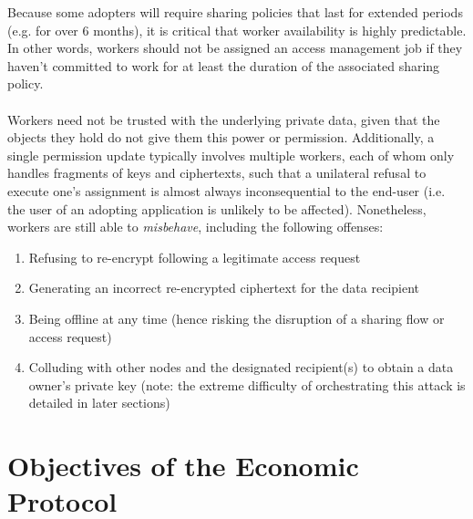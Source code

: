 \documentclass[11pt]{amsart}
\begin{document}
Because some adopters will require sharing policies that last for extended periods (e.g. for over 6 months), it is critical that worker availability is highly predictable. In other words, workers should not be assigned an access management job if they haven't committed to work for at least the duration of the associated sharing policy. 
\\
\\
Workers need not be trusted with the underlying private data, given that the objects they hold do not give them this power or permission. Additionally, a single permission update typically involves multiple workers, each of whom only handles fragments of keys and ciphertexts, such that a unilateral refusal to execute one's assignment is almost always inconsequential to the end-user (i.e. the user of an adopting application is unlikely to be affected). Nonetheless, workers are still able to \textit{misbehave}, including the following offenses: 
\begin{enumerate}
   \item Refusing to re-encrypt following a legitimate access request
   \item Generating an incorrect re-encrypted ciphertext for the data recipient
   \item Being offline at any time (hence risking the disruption of a sharing flow or access request) 
   \item Colluding with other nodes and the designated recipient(s) to obtain a data owner’s private key (note: the extreme difficulty of orchestrating this attack is detailed in later sections) 
   \end{enumerate}


\section{Objectives of the Economic Protocol}
\end{document}
